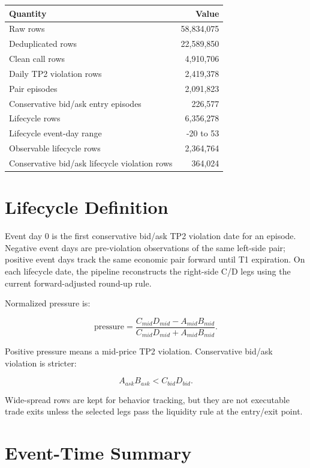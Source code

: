 \documentclass[11pt]{article}
\begin{document}
\begin{center}
\begin{tabular}{lr}
\toprule
Quantity & Value \\
\midrule
Raw rows & 58,834,075 \\
Deduplicated rows & 22,589,850 \\
Clean call rows & 4,910,706 \\
Daily TP2 violation rows & 2,419,378 \\
Pair episodes & 2,091,823 \\
Conservative bid/ask entry episodes & 226,577 \\
Lifecycle rows & 6,356,278 \\
Lifecycle event-day range & -20 to 53 \\
Observable lifecycle rows & 2,364,764 \\
Conservative bid/ask lifecycle violation rows & 364,024 \\
\bottomrule
\end{tabular}
\end{center}

\section{Lifecycle Definition}

Event day 0 is the first conservative bid/ask TP2 violation date for an episode. Negative event
days are pre-violation observations of the same left-side pair; positive event days track the same
economic pair forward until T1 expiration. On each lifecycle date, the pipeline reconstructs the
right-side C/D legs using the current forward-adjusted round-up rule.

Normalized pressure is:

\[
\text{pressure} = \frac{C_{mid}D_{mid} - A_{mid}B_{mid}}{C_{mid}D_{mid} + A_{mid}B_{mid}}.
\]

Positive pressure means a mid-price TP2 violation. Conservative bid/ask violation is stricter:

\[
A_{ask}B_{ask} < C_{bid}D_{bid}.
\]

Wide-spread rows are kept for behavior tracking, but they are not executable trade exits unless
the selected legs pass the liquidity rule at the entry/exit point.

\section{Event-Time Summary}
\end{document}
